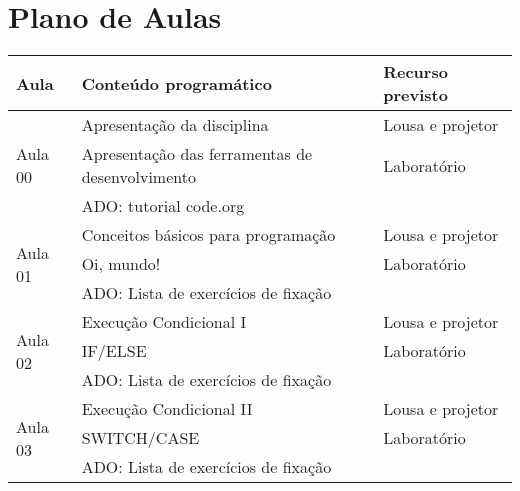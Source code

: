 \documentclass[a4paper]{article}
\begin{document}
    \section{Plano de Aulas}

        \begin{longtable}{lll}

            \toprule

            Aula & Conteúdo programático & Recurso previsto\\

            \toprule
            \toprule

            \multirow{3}{*}{Aula 00} & Apresentação da disciplina                      & Lousa e projetor \\ \cmidrule{2-3}
                                     & Apresentação das ferramentas de desenvolvimento & Laboratório      \\ \cmidrule{2-3}
                                     & ADO: tutorial code.org                                             \\ \midrule

            \multirow{3}{*}{Aula 01} & Conceitos básicos para programação              & Lousa e projetor \\ \cmidrule{2-3}
                                     & Oi, mundo!                                      & Laboratório      \\ \cmidrule{2-3}
                                     & ADO: Lista de exercícios de fixação                                \\ \midrule

            \multirow{3}{*}{Aula 02} & Execução Condicional I                          & Lousa e projetor \\ \cmidrule{2-3}
                                     & IF/ELSE                                         & Laboratório      \\ \cmidrule{2-3}
                                     & ADO: Lista de exercícios de fixação                                \\ \midrule

            \multirow{3}{*}{Aula 03} & Execução Condicional II                         & Lousa e projetor \\ \cmidrule{2-3}
                                     & SWITCH/CASE                                     & Laboratório      \\ \cmidrule{2-3}
                                     & ADO: Lista de exercícios de fixação                                \\ \midrule


\end{longtable}
\end{document}
